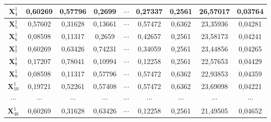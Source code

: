 {{\begin{enumerate}[align = left, left = 0cm, nolistsep]
{\begin{tabularx}{\textwidth}{|c|cccccc|c|c|}
                  $\boldsymbol{X}_{4}^{1}$  & \multicolumn{1}{c|}{0,60269}                    & \multicolumn{1}{c|}{0,57796}  & \multicolumn{1}{c|}{0,2699}   & \multicolumn{1}{c|}{$\cdots$} & \multicolumn{1}{c|}{0,27337}  & 0,2561   & 26,57017 & 0,03764  \\ \hline
                  $\boldsymbol{X}_{5}^{1}$  & \multicolumn{1}{c|}{0,57602}                    & \multicolumn{1}{c|}{0,31628}  & \multicolumn{1}{c|}{0,13661}  & \multicolumn{1}{c|}{$\cdots$} & \multicolumn{1}{c|}{0,57472}  & 0,6362   & 23,35936 & 0,04281  \\ \hline
                  $\boldsymbol{X}_{6}^{1}$  & \multicolumn{1}{c|}{0,08598}                    & \multicolumn{1}{c|}{0,11317}  & \multicolumn{1}{c|}{0,2659}   & \multicolumn{1}{c|}{$\cdots$} & \multicolumn{1}{c|}{0,42657}  & 0,2561   & 23,58173 & 0,04241  \\ \hline
                  $\boldsymbol{X}_{7}^{1}$  & \multicolumn{1}{c|}{0,60269}                    & \multicolumn{1}{c|}{0,63426}  & \multicolumn{1}{c|}{0,74231}  & \multicolumn{1}{c|}{$\cdots$} & \multicolumn{1}{c|}{0,34059}  & 0,2561   & 23,44856 & 0,04265  \\ \hline
                  $\boldsymbol{X}_{8}^{1}$  & \multicolumn{1}{c|}{0,17207}                    & \multicolumn{1}{c|}{0,78041}  & \multicolumn{1}{c|}{0,10994}  & \multicolumn{1}{c|}{$\cdots$} & \multicolumn{1}{c|}{0,12258}  & 0,2561   & 22,57653 & 0,04429  \\ \hline
                  $\boldsymbol{X}_{9}^{1}$  & \multicolumn{1}{c|}{0,08598}                    & \multicolumn{1}{c|}{0,11317}  & \multicolumn{1}{c|}{0,57796}  & \multicolumn{1}{c|}{$\cdots$} & \multicolumn{1}{c|}{0,57472}  & 0,6362   & 22,93853 & 0,04359  \\ \hline
                  $\boldsymbol{X}_{10}^{1}$ & \multicolumn{1}{c|}{0,19721}                    & \multicolumn{1}{c|}{0,52261}  & \multicolumn{1}{c|}{0,57408}  & \multicolumn{1}{c|}{$\cdots$} & \multicolumn{1}{c|}{0,57472}  & 0,6362   & 23,69098 & 0,04221  \\ \hline
                  $\cdots$     & \multicolumn{1}{c|}{$\cdots$}                   & \multicolumn{1}{c|}{$\cdots$} & \multicolumn{1}{c|}{$\cdots$} & \multicolumn{1}{c|}{$\cdots$} & \multicolumn{1}{c|}{$\cdots$} & $\cdots$ & $\cdots$ & $\cdots$ \\ \hline
                  $\boldsymbol{X}_{46}^{1}$ & \multicolumn{1}{c|}{0,60269}                    & \multicolumn{1}{c|}{0,31628}  & \multicolumn{1}{c|}{0,63426}  & \multicolumn{1}{c|}{$\cdots$} & \multicolumn{1}{c|}{0,12258}  & 0,2561   & 21,49505 & 0,04652  \\ \hline

\end{tabularx}}
\end{enumerate}}}
